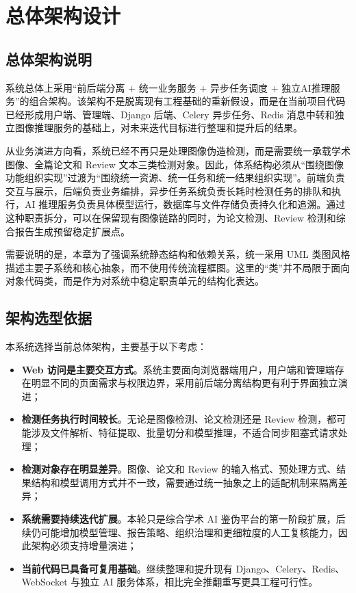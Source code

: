 \section{总体架构设计}

\subsection{总体架构说明}
系统总体上采用“前后端分离 + 统一业务服务 + 异步任务调度 + 独立AI推理服务”的组合架构。该架构不是脱离现有工程基础的重新假设，而是在当前项目代码已经形成用户端、管理端、Django 后端、Celery 异步任务、Redis 消息中转和独立图像推理服务的基础上，对未来迭代目标进行整理和提升后的结果。

从业务演进方向看，系统已经不再只是处理图像伪造检测，而是需要统一承载学术图像、全篇论文和 Review 文本三类检测对象。因此，体系结构必须从“围绕图像功能组织实现”过渡为“围绕统一资源、统一任务和统一结果组织实现”。前端负责交互与展示，后端负责业务编排，异步任务系统负责长耗时检测任务的排队和执行，AI 推理服务负责具体模型运行，数据库与文件存储负责持久化和追溯。通过这种职责拆分，可以在保留现有图像链路的同时，为论文检测、Review 检测和综合报告生成预留稳定扩展点。

需要说明的是，本章为了强调系统静态结构和依赖关系，统一采用 UML 类图风格描述主要子系统和核心抽象，而不使用传统流程框图。这里的“类”并不局限于面向对象代码类，而是作为对系统中稳定职责单元的结构化表达。

\subsection{架构选型依据}
本系统选择当前总体架构，主要基于以下考虑：
\begin{itemize}[leftmargin=2em]
    \item \textbf{Web 访问是主要交互方式}。系统主要面向浏览器端用户，用户端和管理端存在明显不同的页面需求与权限边界，采用前后端分离结构更有利于界面独立演进；
    \item \textbf{检测任务执行时间较长}。无论是图像检测、论文检测还是 Review 检测，都可能涉及文件解析、特征提取、批量切分和模型推理，不适合同步阻塞式请求处理；
    \item \textbf{检测对象存在明显差异}。图像、论文和 Review 的输入格式、预处理方式、结果结构和模型调用方式并不一致，需要通过统一抽象之上的适配机制来隔离差异；
    \item \textbf{系统需要持续迭代扩展}。本轮只是综合学术 AI 鉴伪平台的第一阶段扩展，后续仍可能增加模型管理、报告策略、组织治理和更细粒度的人工复核能力，因此架构必须支持增量演进；
    \item \textbf{当前代码已具备可复用基础}。继续整理和提升现有 Django、Celery、Redis、WebSocket 与独立 AI 服务体系，相比完全推翻重写更具工程可行性。
\end{itemize}

